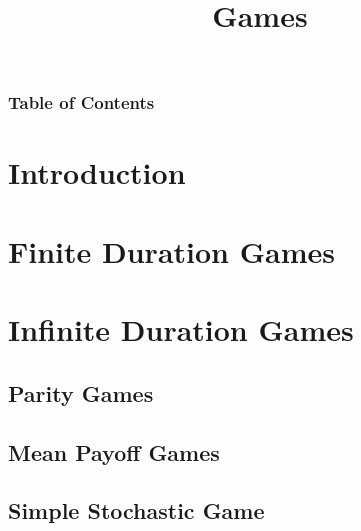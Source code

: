 \documentclass{beamer}
\title{Games}
\begin{document}
  \frame{\titlepage}

  \begin{frame}
    \frametitle{Table of Contents}
    \tableofcontents
  \end{frame}

  \section{Introduction}
  \section{Finite Duration Games}
    
  \section{Infinite Duration Games}
      \subsection{Parity Games}
        
      \subsection{Mean Payoff Games}
        
      \subsection{Simple Stochastic Game}
        
\end{document}
